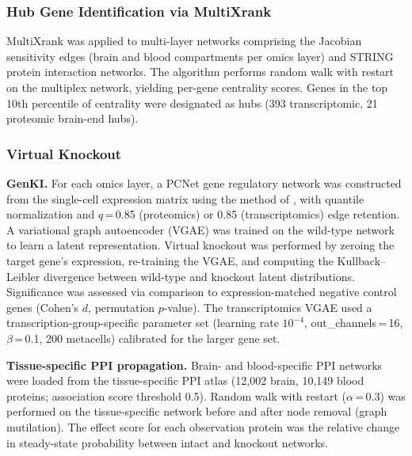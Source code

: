 \documentclass[12pt,a4paper]{article}
\begin{document}
\subsubsection{Hub Gene Identification via MultiXrank}

MultiXrank \citep{baptista2022} was applied to multi-layer networks comprising the Jacobian sensitivity edges (brain and blood compartments per omics layer) and STRING protein interaction networks. The algorithm performs random walk with restart on the multiplex network, yielding per-gene centrality scores. Genes in the top 10th percentile of centrality were designated as hubs (393 transcriptomic, 21 proteomic brain-end hubs).

\subsubsection{Virtual Knockout}

\textbf{GenKI.} For each omics layer, a PCNet gene regulatory network was constructed from the single-cell expression matrix using the method of \citep{senuma2023}, with quantile normalization and $q$\,=\,0.85 (proteomics) or 0.85 (transcriptomics) edge retention. A variational graph autoencoder (VGAE) was trained on the wild-type network to learn a latent representation. Virtual knockout was performed by zeroing the target gene's expression, re-training the VGAE, and computing the Kullback--Leibler divergence between wild-type and knockout latent distributions. Significance was assessed via comparison to expression-matched negative control genes (Cohen's $d$, permutation $p$-value). The transcriptomics VGAE used a transcription-group-specific parameter set (learning rate $10^{-4}$, out\_channels\,=\,16, $\beta$\,=\,0.1, 200 metacells) calibrated for the larger gene set.

\textbf{Tissue-specific PPI propagation.} Brain- and blood-specific PPI networks were loaded from the tissue-specific PPI atlas \citep{lamantrip2025} (12{,}002 brain, 10{,}149 blood proteins; association score threshold 0.5). Random walk with restart ($\alpha$\,=\,0.3) was performed on the tissue-specific network before and after node removal (graph mutilation). The effect score for each observation protein was the relative change in steady-state probability between intact and knockout networks.
\end{document}

